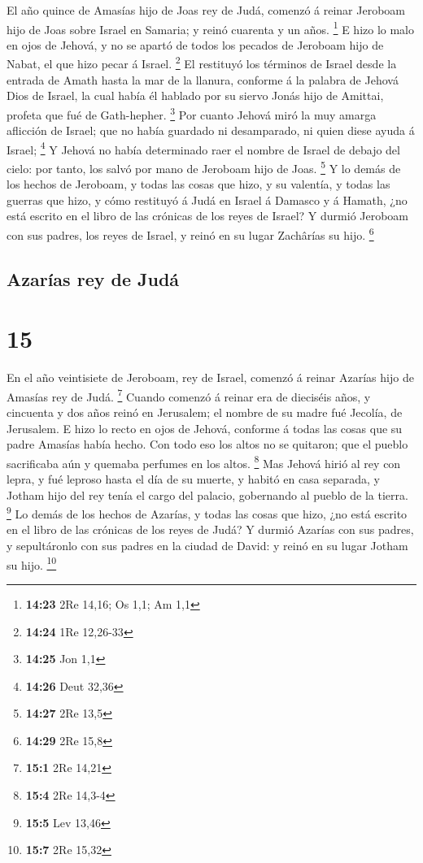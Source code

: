  El año quince de Amasías hijo de Joas rey de Judá,
comenzó á reinar Jeroboam hijo de Joas sobre Israel en Samaria; y reinó
cuarenta y un años. \footnote{\textbf{14:23} 2Re 14,16; Os 1,1; Am 1,1}
 E hizo lo malo en ojos de Jehová, y no se apartó de
todos los pecados de Jeroboam hijo de Nabat, el que hizo pecar á Israel.
\footnote{\textbf{14:24} 1Re 12,26-33}  El restituyó los
términos de Israel desde la entrada de Amath hasta la mar de la llanura,
conforme á la palabra de Jehová Dios de Israel, la cual había él hablado
por su siervo Jonás hijo de Amittai, profeta que fué de Gath-hepher.
\footnote{\textbf{14:25} Jon 1,1}  Por cuanto Jehová miró
la muy amarga aflicción de Israel; que no había guardado ni desamparado,
ni quien diese ayuda á Israel; \footnote{\textbf{14:26} Deut 32,36}
 Y Jehová no había determinado raer el nombre de Israel
de debajo del cielo: por tanto, los salvó por mano de Jeroboam hijo de
Joas. \footnote{\textbf{14:27} 2Re 13,5}  Y lo demás de
los hechos de Jeroboam, y todas las cosas que hizo, y su valentía, y
todas las guerras que hizo, y cómo restituyó á Judá en Israel á Damasco
y á Hamath, ¿no está escrito en el libro de las crónicas de los reyes de
Israel?  Y durmió Jeroboam con sus padres, los reyes de
Israel, y reinó en su lugar Zachârías su hijo. \footnote{\textbf{14:29}
  2Re 15,8}

\hypertarget{azaruxedas-rey-de-juduxe1}{%
\subsection{Azarías rey de Judá}\label{azaruxedas-rey-de-juduxe1}}

\hypertarget{section-14}{%
\section{15}\label{section-14}}

 En el año veintisiete de Jeroboam, rey de Israel, comenzó
á reinar Azarías hijo de Amasías rey de Judá. \footnote{\textbf{15:1}
  2Re 14,21}  Cuando comenzó á reinar era de dieciséis
años, y cincuenta y dos años reinó en Jerusalem; el nombre de su madre
fué Jecolía, de Jerusalem.  E hizo lo recto en ojos de
Jehová, conforme á todas las cosas que su padre Amasías había hecho.
 Con todo eso los altos no se quitaron; que el pueblo
sacrificaba aún y quemaba perfumes en los altos. \footnote{\textbf{15:4}
  2Re 14,3-4}  Mas Jehová hirió al rey con lepra, y fué
leproso hasta el día de su muerte, y habitó en casa separada, y Jotham
hijo del rey tenía el cargo del palacio, gobernando al pueblo de la
tierra. \footnote{\textbf{15:5} Lev 13,46}  Lo demás de
los hechos de Azarías, y todas las cosas que hizo, ¿no está escrito en
el libro de las crónicas de los reyes de Judá?  Y durmió
Azarías con sus padres, y sepultáronlo con sus padres en la ciudad de
David: y reinó en su lugar Jotham su hijo. \footnote{\textbf{15:7} 2Re
  15,32}


